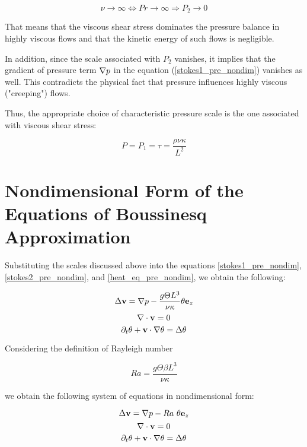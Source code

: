 $$ \nu \longrightarrow \infty \Longleftrightarrow Pr \longrightarrow \infty \Longrightarrow P_2 \longrightarrow 0 $$

That means that the viscous shear stress dominates the pressure balance in highly viscous flows and that the kinetic energy of such flows is negligible.

In addition, since the scale associated with $P_2$ vanishes, it implies that the gradient of pressure term $\nabla p$ in the equation (\ref{stokes1_pre_nondim}) vanishes as well. This contradicts the physical fact that pressure influences highly viscous ("creeping") flows.\cite[pp. 433-434]{leal}

Thus, the appropriate choice of characteristic pressure scale is the one associated with viscous shear stress:

$$ P = P_1 = \tau = \frac{\rho \nu \kappa}{L^2}$$

\section{Nondimensional Form of the Equations of Boussinesq Approximation}

Substituting the scales discussed above into the equations \ref{stokes1_pre_nondim}, \ref{stokes2_pre_nondim}, and \ref{heat_eq_pre_nondim}, we obtain the following:

\begin{equation} \label{stokes1_nondim_no_parameters}
\Delta\mathbf{v} = \nabla p - \frac{g \Theta L^3}{\nu \kappa} \theta \mathbf{e}_z
\end{equation}
\begin{equation} \label{stokes2_nondim_no_parameters}
\nabla\cdot \mathbf{v} = 0
\end{equation}
\begin{equation} \label{heat_eq_nondim_no_parameters}
\partial_t\theta + \mathbf{v}\cdot\nabla\theta = \Delta\theta  
\end{equation} 

Considering the definition of Rayleigh number 

$$ Ra = \frac{g\Theta \beta L^3}{\nu\kappa} $$

we obtain the following system of equations in nondimensional form:

\begin{equation} \label{NS1_viscNondim_boussinesq_prandtl}
\Delta\mathbf{v} = \nabla p - Ra ~\theta \mathbf{e}_z
\end{equation}
\begin{equation} \label{NS2_viscNondim_boussinesq_prandtl}
\nabla\cdot \mathbf{v} = 0
\end{equation}
\begin{equation} \label{heat_eq_viscNondim_boussinesq_prandtl}
\partial_t\theta + \mathbf{v}\cdot\nabla\theta = \Delta\theta  
\end{equation} 

